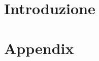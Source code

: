 \providecommand{\main}{.}






{\hypersetup{hidelinks}
  \tableofcontents  %
}

\clearpage
\chapter{Introduzione}


\appendix
\chapter{Appendix}




